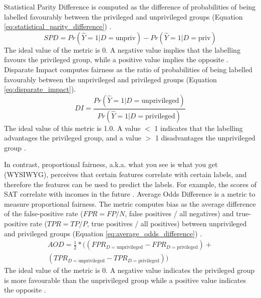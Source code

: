 \documentclass[sigconf]{acmart}
\begin{document}
	Statistical Parity Difference is computed as the difference of probabilities of being labelled favourably between the privileged and unprivileged groups (Equation \ref{eq:statistical_parity_difference}) \cite{dwork2012fairness,ibmaif3602022doc,bellamy2018ai}. 
	\begin{equation} \label{eq:statistical_parity_difference}
		SPD = Pr(\hat{Y} = 1 | D = \text{unpriv})
		- Pr(\hat{Y} = 1 | D = \text{priv})
	\end{equation}
	The ideal value of the metric is 0. A negative value implies that the labelling favours the privileged group, while a positive value implies the opposite \cite{ibmaif3602022doc,bellamy2018ai}. Disparate Impact \cite{feldman2015disparate,ibmaif3602022doc,bellamy2018ai} computes fairness as the ratio of probabilities of being labelled favourably between the unprivileged and privileged groups (Equation \ref{eq:disparate_impact}).
	\begin{equation} \label{eq:disparate_impact}
		DI = \frac{Pr(\hat{Y} = 1 | D = \text{unprivileged})}
		{Pr(\hat{Y} = 1 | D = \text{privileged})}
	\end{equation}
	The ideal value of this metric is 1.0. A value $<$ 1 indicates that the labelling advantages the privileged group, and a value $>$ 1 disadvantages the unprivileged group \cite{ibmaif3602022doc,bellamy2018ai}.
	
	In contrast, proportional fairness, a.k.a. what you see is what you get (WYSIWYG),  perceives that certain features correlate with certain labels, and therefore the features can be used to predict the labels. For example, the scores of SAT correlate with incomes in the future \cite{mahoney2020ai,ibmaif3602022guidance}. Average Odds Difference is a metric to measure proportional fairness. The metric computes bias as the average difference of the false-positive rate ($FPR = FP/N$, false positives / all negatives) and true-positive rate ($TPR = TP/P$, true positives / all positives) between unprivileged and privileged groups (Equation \ref{eq:average_odds_difference}) \cite{ibmaif3602022doc,bellamy2018ai}.
	\begin{equation} \label{eq:average_odds_difference}
		\begin{aligned}
			AOD = \tfrac{1}{2}* ((FPR_{D = \text{unprivileged}} - FPR_{D = \text{privileged}}) +\\
			(TPR_{D = \text{unprivileged}} - TPR_{D = \text{privileged}}))
		\end{aligned}
	\end{equation}
	The ideal value of the metric is 0. A negative value indicates the privileged group is more favourable than the unprivileged group while a positive value indicates the opposite \cite{ibmaif3602022doc,bellamy2018ai}. 
	
\end{document}
